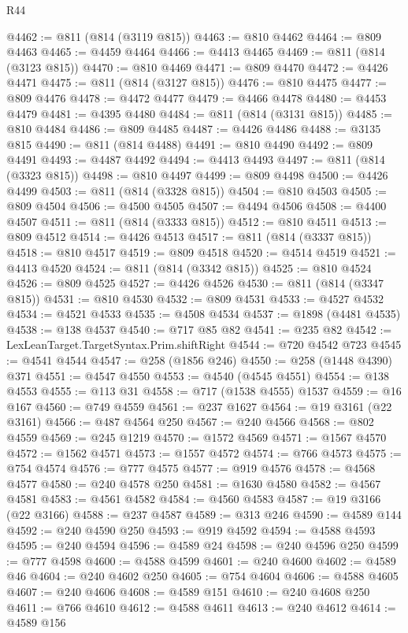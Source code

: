 \begin{lexlean}{R44}
\begin{coremodule}
{@4462 := @811 (@814 (@3119 @815))
@4463 := @810 @4462
@4464 := @809 @4463
@4465 := @4459 @4464
@4466 := @4413 @4465
@4469 := @811 (@814 (@3123 @815))
@4470 := @810 @4469
@4471 := @809 @4470
@4472 := @4426 @4471
@4475 := @811 (@814 (@3127 @815))
@4476 := @810 @4475
@4477 := @809 @4476
@4478 := @4472 @4477
@4479 := @4466 @4478
@4480 := @4453 @4479
@4481 := @4395 @4480
@4484 := @811 (@814 (@3131 @815))
@4485 := @810 @4484
@4486 := @809 @4485
@4487 := @4426 @4486
@4488 := @3135 @815
@4490 := @811 (@814 @4488)
@4491 := @810 @4490
@4492 := @809 @4491
@4493 := @4487 @4492
@4494 := @4413 @4493
@4497 := @811 (@814 (@3323 @815))
@4498 := @810 @4497
@4499 := @809 @4498
@4500 := @4426 @4499
@4503 := @811 (@814 (@3328 @815))
@4504 := @810 @4503
@4505 := @809 @4504
@4506 := @4500 @4505
@4507 := @4494 @4506
@4508 := @4400 @4507
@4511 := @811 (@814 (@3333 @815))
@4512 := @810 @4511
@4513 := @809 @4512
@4514 := @4426 @4513
@4517 := @811 (@814 (@3337 @815))
@4518 := @810 @4517
@4519 := @809 @4518
@4520 := @4514 @4519
@4521 := @4413 @4520
@4524 := @811 (@814 (@3342 @815))
@4525 := @810 @4524
@4526 := @809 @4525
@4527 := @4426 @4526
@4530 := @811 (@814 (@3347 @815))
@4531 := @810 @4530
@4532 := @809 @4531
@4533 := @4527 @4532
@4534 := @4521 @4533
@4535 := @4508 @4534
@4537 := @1898 (@4481 @4535)
@4538 := @138 @4537
@4540 := @717 @85 @82
@4541 := @235 @82
@4542 := LexLeanTarget.TargetSyntax.Prim.shiftRight
@4544 := @720 @4542 @723
@4545 := @4541 @4544
@4547 := @258 (@1856 @246)
@4550 := @258 (@1448 @4390) @371
@4551 := @4547 @4550
@4553 := @4540 (@4545 @4551)
@4554 := @138 @4553
@4555 := @113 @31
@4558 := @717 (@1538 @4555) @1537
@4559 := @16 @167
@4560 := @749 @4559
@4561 := @237 @1627
@4564 := @19 @3161 (@22 @3161)
@4566 := @487 @4564 @250
@4567 := @240 @4566
@4568 := @802 @4559
@4569 := @245 @1219
@4570 := @1572 @4569
@4571 := @1567 @4570
@4572 := @1562 @4571
@4573 := @1557 @4572
@4574 := @766 @4573
@4575 := @754 @4574
@4576 := @777 @4575
@4577 := @919 @4576
@4578 := @4568 @4577
@4580 := @240 @4578 @250
@4581 := @1630 @4580
@4582 := @4567 @4581
@4583 := @4561 @4582
@4584 := @4560 @4583
@4587 := @19 @3166 (@22 @3166)
@4588 := @237 @4587
@4589 := @313 @246
@4590 := @4589 @144
@4592 := @240 @4590 @250
@4593 := @919 @4592
@4594 := @4588 @4593
@4595 := @240 @4594
@4596 := @4589 @24
@4598 := @240 @4596 @250
@4599 := @777 @4598
@4600 := @4588 @4599
@4601 := @240 @4600
@4602 := @4589 @46
@4604 := @240 @4602 @250
@4605 := @754 @4604
@4606 := @4588 @4605
@4607 := @240 @4606
@4608 := @4589 @151
@4610 := @240 @4608 @250
@4611 := @766 @4610
@4612 := @4588 @4611
@4613 := @240 @4612
@4614 := @4589 @156
}
\end{coremodule}
\end{lexlean}
